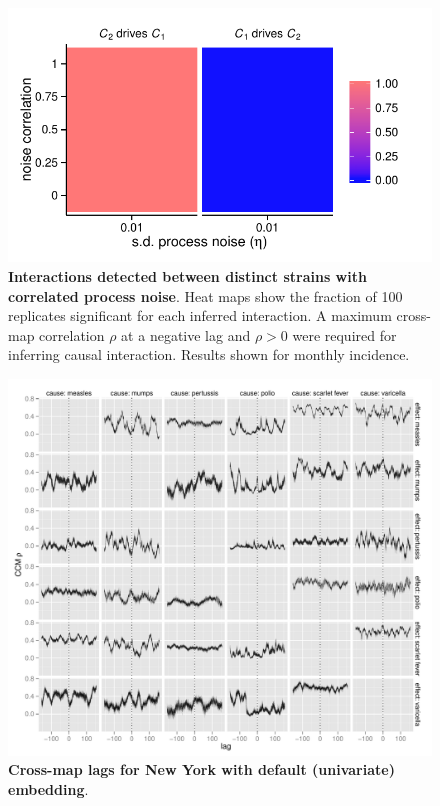 \documentclass[10pt]{article}
\begin{document}
\begin{figure}
\begin{center}
  \includegraphics[width=5in]{dataflow/out/fig_detect_corrproc_distinct/fig_detect_corrproc_distinct.pdf}
  \end{center}
  \caption{\textbf{Interactions detected between distinct strains with correlated process noise}. Heat maps show the fraction of 100 replicates significant for each inferred interaction. A maximum cross-map correlation $\rho$ at a negative lag and $\rho>0$ were required for inferring causal interaction. Results shown for monthly incidence.  \label{fig:diff_corr_tmp}}
\end{figure}

\begin{figure}
\begin{center}
  \includegraphics[width=5in]{dataflow/out/fig_cities_corrbylag/nyc_self_uniform_plot.pdf}
  \end{center}
  \caption{\textbf{Cross-map lags for New York with default (univariate) embedding}.  \label{fig:nyc_uni_tmp}}
\end{figure}
\end{document}
